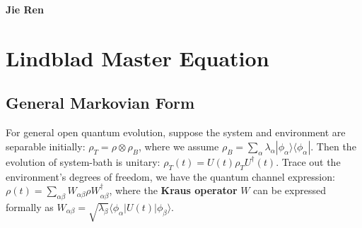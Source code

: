 \documentclass{SciPost}
\begin{document}
\pagestyle{SPstyle}

\begin{center}{\Large \textbf{\color{scipostdeepblue}{
Lindblad Equation\\
}}}\end{center}

\begin{center}
\textbf{Jie Ren}
\end{center}

\tableofcontents

\section{Lindblad Master Equation}
\subsection{General Markovian Form}
For general open quantum evolution, suppose the system and environment are separable initially: $\rho_T=\rho\otimes\rho_B$, where we assume $\rho_B=\sum_\alpha \lambda_\alpha |\phi_\alpha\rangle\langle\phi_\alpha |$. Then the evolution of system-bath is unitary: $\rho_T(t) = U(t)\rho_TU^\dagger(t)$. Trace out the environment's degrees of freedom, we have the quantum channel expression: $\rho(t) = \sum_{\alpha\beta} W_{\alpha\beta} \rho W^\dagger_{\alpha\beta}$, where the \textbf{Kraus operator} $W$ can be expressed formally as $W_{\alpha\beta} = \sqrt{\lambda_\beta} \langle\phi_\alpha|U(t)|\phi_\beta\rangle$.
\end{document}
